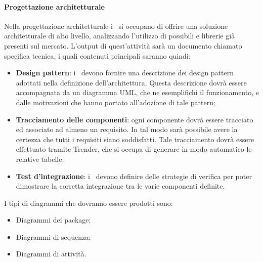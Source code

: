 \documentclass[../NormeDiProgetto_v4.0.0.tex]{subfiles}
\begin{document}
		\paragraph{Progettazione architetturale}
			Nella progettazione architetturale i \progettisti\ si occupano di offrire una soluzione architetturale di alto livello, analizzando l'utilizzo di possibili  e librerie già presenti sul mercato.
			L'output di quest'attività sarà un documento chiamato specifica tecnica, i quali contenuti principali saranno quindi:
			\begin{itemize}
				\item \textbf{Design pattern}: i \progettisti\ devono fornire una descrizione dei design pattern adottati
				nella definizione dell'architettura. Questa descrizione dovrà essere accompagnata da un
				diagramma UML, che ne esemplifichi il funzionamento, e dalle motivazioni che hanno
				portato all'adozione di tale pattern;
				\item \textbf{Tracciamento delle componenti}: ogni componente dovrà essere tracciato ed associato
				ad almeno un requisito. In tal modo sarà possibile avere la certezza che tutti i requisiti
				siano soddisfatti. Tale tracciamento dovrà essere effettuato tramite Trender, che si occupa
				di generare in modo automatico le relative tabelle;
				\item \textbf{Test d'integrazione}: i \progettisti\ devono definire delle strategie di verifica per poter
				dimostrare la corretta integrazione tra le varie componenti definite.
			\end{itemize}

			I tipi di diagrammi che dovranno essere prodotti sono:
			\begin{itemize}
				\item Diagrammi dei package;
				\item Diagrammi di sequenza;
				\item Diagrammi di attività.
			\end{itemize}
\end{document}
